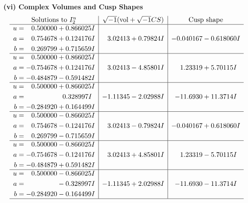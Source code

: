 \documentclass[1p]{elsarticle_modified}
\theoremstyle{definition}
\newcommand{\I}{\sqrt{-1}}
\begin{document}
\newpage\flushleft \textbf{(vi) Complex Volumes and Cusp Shapes}
$$\begin{array}{c|c|c}  
\text{Solutions to }I^u_{2}& \I (\text{vol} + \sqrt{-1}CS) & \text{Cusp shape}\\
 \hline 
\begin{aligned}
u &= \phantom{-}0.500000 + 0.866025 I \\
a &= \phantom{-}0.754678 + 0.124176 I \\
b &= \phantom{-}0.269799 + 0.715659 I\end{aligned}
 & \phantom{-}3.02413 + 0.79824 I & -0.040167 - 0.618060 I \\ \hline\begin{aligned}
u &= \phantom{-}0.500000 + 0.866025 I \\
a &= -0.754678 + 0.124176 I \\
b &= -0.484879 - 0.591482 I\end{aligned}
 & \phantom{-}3.02413 - 4.85801 I & \phantom{-}1.23319 + 5.70115 I \\ \hline\begin{aligned}
u &= \phantom{-}0.500000 + 0.866025 I \\
a &= \phantom{-0.000000 -}0.328997 I \\
b &= -0.284920 + 0.164499 I\end{aligned}
 & -1.11345 - 2.02988 I & -11.6930 + 11.3714 I \\ \hline\begin{aligned}
u &= \phantom{-}0.500000 - 0.866025 I \\
a &= \phantom{-}0.754678 - 0.124176 I \\
b &= \phantom{-}0.269799 - 0.715659 I\end{aligned}
 & \phantom{-}3.02413 - 0.79824 I & -0.040167 + 0.618060 I \\ \hline\begin{aligned}
u &= \phantom{-}0.500000 - 0.866025 I \\
a &= -0.754678 - 0.124176 I \\
b &= -0.484879 + 0.591482 I\end{aligned}
 & \phantom{-}3.02413 + 4.85801 I & \phantom{-}1.23319 - 5.70115 I \\ \hline\begin{aligned}
u &= \phantom{-}0.500000 - 0.866025 I \\
a &= \phantom{-0.000000 } -0.328997 I \\
b &= -0.284920 - 0.164499 I\end{aligned}
 & -1.11345 + 2.02988 I & -11.6930 - 11.3714 I\\
 \hline 
 \end{array}$$\newpage\newpage\renewcommand{\arraystretch}{1}
\end{document}
